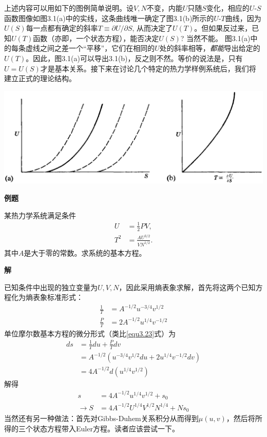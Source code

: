 上述内容可以用如下的图例简单说明。设$V, N$不变，内能$U$只随$S$变化，相应的$U\text{-}S$函数图像如图3.1(a)中的实线，这条曲线唯一确定了图3.1(b)所示的$U\text{-}T$曲线，因为$U(S)$每一点都有确定的斜率$T \equiv \partial U / \partial S$, 从而决定了$U(T)$。但如果反过来，已知$U(T)$函数（亦即，一个状态方程），能否决定$U(S)$? 当然不能。 图3.1(a)中的每条虚线之间之差一个“平移”，它们在相同的$U$处的斜率相等，{\it 都能}导出给定的$U(T)$。因此，图3.1(a)可以导出3.1(b)，反之则不然。等价的说法是，只有$U = U(S)$才是基本关系。接下来在讨论几个特定的热力学样例系统后，我们将建立正式的理论结构。

{
	\includegraphics[scale=0.25]{fig3_1.eps} 
	\figcaption{ }
}

{\bf 例题}

某热力学系统满足条件
\begin{align*}
    U &= \frac{1}{2} PV, \\
    T^2 &= \frac{AU^{3/2}}{VN^{1/2}}.
\end{align*}
其中$A$是大于零的常数。求系统的基本方程。

{\bf 解}

已知条件中出现的独立变量为$U, V, N$，因此采用熵表象求解，首先将这两个已知方程化为熵表象标准形式：
\begin{align*}
    \frac{1}{T} &= A^{-1/2} u^{-3/4} v^{1/2} \\
    \frac{P}{T} &= 2A^{-1/2} u^{1/4} v^{-1/2}
\end{align*}
单位摩尔数基本方程的微分形式（类比\eqref{equ3.23}式）为
\begin{align*}
    ds &= \frac{1}{T} du + \frac{P}{T} dv \\
    &= A^{-1/2} (u^{-3/4} v^{1/2} du + 2u^{1/4} v^{-1/2} dv) \\
    &= 4A^{-1/2} d(u^{1/4} v^{1/2})
\end{align*}
解得
\begin{align*}
    s &= 4A^{-1/2} u^{1/4} v^{1/2} + s_0 \\
    \to S &= 4A^{-1/2} U^{1/4} V^{1/2} N^{1/4} + Ns_0
\end{align*}
当然还有另一种做法：首先对Gibbs-Duhem关系积分从而得到$\mu (u, v)$，然后将所得的三个状态方程带入Euler方程。读者应该尝试一下。

